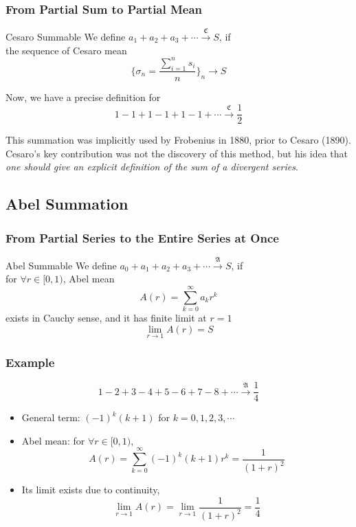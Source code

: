 \documentclass{beamer}
\begin{document}
\begin{frame}
\frametitle{From Partial Sum to Partial Mean}

\begin{block}{Cesaro Summable}
We define $ a_1 + a_2 + a_3 + \cdots \stackrel{\mathfrak{C}}{\longrightarrow} S $, if \\
\qquad the sequence of \alert{Cesaro mean} 
$$ \bigg\{ \sigma_n = \frac{\sum_{i=1}^n s_i}{n} \bigg\}_n \rightarrow S $$
\end{block}

Now, we have a precise definition for 
$$ 1 - 1 + 1 - 1 + 1 - 1 + \cdots \stackrel{\mathfrak{C}}{\longrightarrow} \frac{1}{2} $$

This summation was implicitly used by Frobenius in 1880, prior to Cesaro (1890). Cesaro's key contribution was not the discovery of this method, but his idea that \emph{one should give an explicit definition of the sum of a divergent series}.

\end{frame}


\subsection{Abel Summation}

\begin{frame}
\frametitle{From Partial Series to the Entire Series at Once}

\begin{block}{Abel Summable}
We define $ a_0 + a_1 + a_2 + a_3 + \cdots \stackrel{\mathfrak{A}}{\longrightarrow} S $, if \\
\qquad for $ \forall r \in [0,1) $, \alert{Abel mean} 
$$ A(r) = \sum_{k=0}^{\infty} a_k r^k $$
\qquad exists in Cauchy sense, and it has finite limit at $ r = 1 $
$$ \lim_{r \rightarrow 1} A(r) = S $$
\end{block}

\end{frame}


\begin{frame}
\frametitle{Example} 

$$ 1 - 2 + 3 - 4 + 5 - 6 + 7 - 8 + \cdots \stackrel{\mathfrak{A}}{\longrightarrow} \frac{1}{4} $$
\begin{itemize}
    \item General term: $ (-1)^k (k+1) $ for $ k = 0, 1, 2, 3, \cdots $
    \item Abel mean: for $ \forall r \in [0,1) $, 
    $$ A(r) = \sum_{k=0}^{\infty} (-1)^k (k+1)r^k = \frac{1}{(1+r)^2} $$ 
    \item Its limit exists due to continuity, 
    $$ \lim_{r \rightarrow 1} A(r) = \lim_{r \rightarrow 1} \frac{1}{(1+r)^2} = \frac{1}{4} $$
\end{itemize}

\end{frame}
\end{document}
